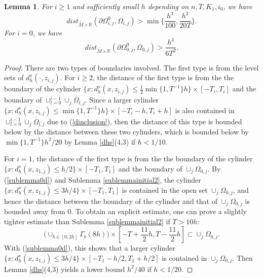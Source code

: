 \documentclass[11pt,letterpaper]{amsart}
\numberwithin{equation}{section}
\theoremstyle{definition}
\theoremstyle{plain}
\theoremstyle{definition}
\theoremstyle{plain}
\theoremstyle{definition}
\theoremstyle{plain}
\newtheorem{mindistance}[riccati]{Lemma}
\begin{document}
\begin{mindistance}\label{mindistance}
For $i\geqslant 1$ and sufficiently small $h$ depending on $n,T,K_1,i_0$, we have
$$dist_{\widetilde{M}\times \mathbb{R}}(\partial \Omega_{i,j}^0,\Omega_{i,j}) > \min\{\frac{h^3}{100},\frac{h^2}{20T}\}.$$
For $i=0$, we have
$$dist_{\widetilde{M}\times \mathbb{R}}(\partial \Omega_{0,j}^0,\Omega_{0,j}) > \frac{h^3}{6T^2}.$$
\end{mindistance}
\begin{proof}
There are two types of boundaries involved. The first type is from the level sets of $d_h^s(\cdot,z_{i,j})$. For $i\geqslant 2$, the distance of the first type is from the the boundary of the cylinder $\{x: d_h^s(x,z_{i,j}) \leqslant  \frac{1}{2}\min\{1,T^{-1}\}h\}\times [-T_i,T_i]$ and the boundary of $\cup_{l=0}^{i-1}\cup_{j}\overline{\Omega}_{l,j}$. Since a larger cylinder $\{x: d_h^s(x,z_{i,j}) \leqslant \min\{1,T^{-1}\}h\}\times [-T_i-h,T_i+h]$ is also contained in $\cup_{l=0}^{i-1}\cup_{j}\overline{\Omega}_{l,j}$ due to (\ref{dinclusion}), then the distance of this type is bounded below by the distance between these two cylinders, which is bounded below by $\min\{1,T^{-1}\}h^2/20$ by Lemma \ref{dhs}(4,3) if $h<1/10$. 

For $i=1$, the distance of the first type is from the the boundary of the cylinder $\{x: d_h^s(x,z_{1,j}) \leqslant  h/2\}\times [-T_1,T_1]$ and the boundary of $\cup_{j}\Omega_{0,j}$. By (\ref{sublemma0d}) and Sublemma \ref{sublemmainitial2}, the cylinder $\{x: d_h^s(x,z_{1,j}) \leqslant  3h/4\}\times [-T_1,T_1]$ is contained in the open set $\cup_{j}\Omega_{0,j}$, and hence the distance between the boundary of the cylinder and that of $\cup_{j}\Omega_{0,j}$ is bounded away from 0. To obtain an explicit estimate, one can prove a slightly tighter estimate than Sublemma \ref{sublemmainitial2} if $T>10h$:
$$\big(\cup_{b\in [0,2h]}\Gamma_b(8h)\big)\times [-T+\frac{11}{2}h,T-\frac{11}{2}h] \subset \cup_j\Omega_{0,j}.$$
With (\ref{sublemma0d}), this shows that a larger cylinder $\{x: d_h^s(x,z_{1,j}) \leqslant  3h/4\}\times [-T_1-h/2,T_1+h/2]$ is contained in $\cup_{j}\Omega_{0,j}$. Then Lemma \ref{dhs}(4,3) yields a lower bound $h^2/40$ if $h<1/20$.


\end{proof}
\end{document}
